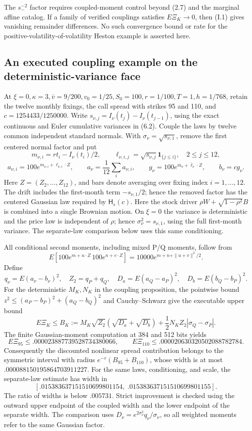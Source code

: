 The \(s_-^{-2}\) factor requires coupled-moment control beyond (2.7) and
the marginal affine catalog.
If a family of verified couplings satisfies \(E\Xi_K\to0\), then (I.1)
gives vanishing remainder differences. No such convergence bound or rate
for the positive-volatility-of-volatility Heston example is asserted here.

\subsection{An executed coupling example on the deterministic-variance face}

At \(\xi=0,\kappa=3,\bar v=9/200,v_0=1/25,S_0=100,r=1/100,T=1,h=1/768\), retain the twelve
monthly fixings, the call spread with strikes 95 and 110, and
\(c=1254433/1250000\). Write
\(s_{\nu,j}=I_\nu(t_j)-I_\nu(t_{j-1})\), using the exact continuous and
Euler cumulative variances in (6.2). Couple the laws by twelve common
independent standard normals. With \(\sigma_\nu=\sqrt{s_{\nu,1}}\), remove the first
centered normal factor and put
\[
m_{\nu,i}=rt_i-I_\nu(t_i)/2,\qquad
\ell_{\nu,i,j}=\sqrt{s_{\nu,j}}\mathbf1_{\{j\le i\}},\quad 2\le j\le12,
\]
\[
a_{\nu,i}=100e^{m_{\nu,i}+\ell_{\nu,i}\cdot Z},\qquad
a_\nu=\frac1{12}\sum_i a_{\nu,i},\qquad
g_\nu=100e^{\bar m_\nu+\bar\ell_\nu\cdot Z},\qquad b_\nu=cg_\nu.
\]
Here \(Z=(Z_2,\ldots,Z_{12})\), and bars denote averaging over fixing
index \(i=1,\ldots,12\).
The drift includes the first-month term \(-s_{\nu,1}/2\); hence the removed
factor has the centered Gaussian law required by \(\mathsf H_s(c)\).
Here the stock driver \(\rho W+\sqrt{1-\rho^2}B\) is combined into a single
Brownian motion. On \(\xi=0\) the variance is deterministic and the price
law is independent of \(\rho\); hence \(\sigma_\nu^2=s_{\nu,1}\), using
the full first-month variance. The separate-law comparison below uses this
same conditioning.

All conditional second moments, including mixed P/Q moments, follow from
\[
E\!\left[100e^{m+u\cdot Z}\,100e^{n+v\cdot Z}\right]
=10000e^{m+n+\|u+v\|^2/2}.
\]
Define
\[
q_\nu=E(a_\nu-b_\nu)^2,\quad Z_2=q_P+q_Q,\quad
D_a=E(a_Q-a_P)^2,\quad D_b=E(b_Q-b_P)^2.
\]
For the deterministic \(M_K,N_K\) in the coupling proposition, the
pointwise bound \(z^2\le(a_P-b_P)^2+(a_Q-b_Q)^2\) and
Cauchy--Schwarz give the executable upper bound
\[
E\Xi_K\le B_K:=
M_K\sqrt{Z_2}(\sqrt{D_a}+\sqrt{D_b})
+\frac12N_KZ_2|\sigma_Q-\sigma_P|.
\]
The finite Gaussian-moment computation at 384 and 512 bits yields
\[
E\Xi_{95}\le .000023887739528734380066,\qquad
E\Xi_{110}\le .000020630320502088782784.
\]
Consequently the discounted nonlinear spread contribution belongs to the
symmetric interval with radius \(e^{-r}(B_{95}+B_{110})\), whose width is
at most \(.000088150195864703911227\). For the same laws, conditioning,
and scale, the separate-law estimate has width in
\[
[.015383637151510699801154,\;.015383637151510699801155].
\]
The ratio of widths is below \(.005731\). Strict improvement is checked
using the outward upper endpoint of the coupled width and the lower endpoint
of the separate width. The comparison uses
\(D_\nu=e^{2\sigma_\nu^2}q_\nu/\sigma_\nu\), so all weighted moments
refer to the same Gaussian factor.

